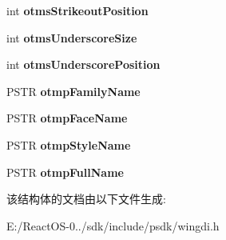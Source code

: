 \begin{DoxyCompactItemize}
int {\bfseries otms\+Strikeout\+Position}
\item 
\mbox{\label{struct___o_u_t_l_i_n_e_t_e_x_t_m_e_t_r_i_c_w_a163c5ae4133e2554a196e175b2adb218}} 
int {\bfseries otms\+Underscore\+Size}
\item 
\mbox{\label{struct___o_u_t_l_i_n_e_t_e_x_t_m_e_t_r_i_c_w_adf5720d7f44a32c4b6fa81da802e739f}} 
int {\bfseries otms\+Underscore\+Position}
\item 
\mbox{\label{struct___o_u_t_l_i_n_e_t_e_x_t_m_e_t_r_i_c_w_a8a743d13732e541b14c1b88a4fb79403}} 
P\+S\+TR {\bfseries otmp\+Family\+Name}
\item 
\mbox{\label{struct___o_u_t_l_i_n_e_t_e_x_t_m_e_t_r_i_c_w_ae799010e6cd6ae255de3e169cfd59b90}} 
P\+S\+TR {\bfseries otmp\+Face\+Name}
\item 
\mbox{\label{struct___o_u_t_l_i_n_e_t_e_x_t_m_e_t_r_i_c_w_aa72187d96c6f16307a53e0ca60175a1c}} 
P\+S\+TR {\bfseries otmp\+Style\+Name}
\item 
\mbox{\label{struct___o_u_t_l_i_n_e_t_e_x_t_m_e_t_r_i_c_w_a6c8edf5ee22d79fba59523f4c4473b57}} 
P\+S\+TR {\bfseries otmp\+Full\+Name}
\end{DoxyCompactItemize}


该结构体的文档由以下文件生成\+:\begin{DoxyCompactItemize}
\item 
E\+:/\+React\+O\+S-\/0../sdk/include/psdk/wingdi.\+h\end{DoxyCompactItemize}
